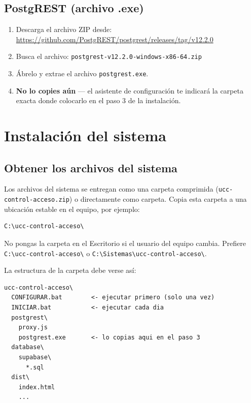 \documentclass[12pt, a4paper]{article}
\begin{document}
\subsection{PostgREST (archivo .exe)}

\begin{enumerate}
  \item Descarga el archivo ZIP desde:\\
        \url{https://github.com/PostgREST/postgrest/releases/tag/v12.2.0}
  \item Busca el archivo: \texttt{postgrest-v12.2.0-windows-x86-64.zip}
  \item Ábrelo y extrae el archivo \texttt{postgrest.exe}.
  \item \textbf{No lo copies aún} — el asistente de configuración te indicará
        la carpeta exacta donde colocarlo en el paso 3 de la instalación.
\end{enumerate}

\section{Instalación del sistema}

\subsection{Obtener los archivos del sistema}

Los archivos del sistema se entregan como una carpeta comprimida
(\texttt{ucc-control-acceso.zip}) o directamente como carpeta.
Copia esta carpeta a una ubicación estable en el equipo, por ejemplo:

\begin{lstlisting}
C:\ucc-control-acceso\
\end{lstlisting}

\begin{importante}
  No pongas la carpeta en el Escritorio si el usuario del equipo cambia.
  Prefiere \texttt{C:\textbackslash{}ucc-control-acceso\textbackslash{}} o
  \texttt{C:\textbackslash{}Sistemas\textbackslash{}ucc-control-acceso\textbackslash{}}.
\end{importante}

La estructura de la carpeta debe verse así:

\begin{lstlisting}
ucc-control-acceso\
  CONFIGURAR.bat        <- ejecutar primero (solo una vez)
  INICIAR.bat           <- ejecutar cada dia
  postgrest\
    proxy.js
    postgrest.exe       <- lo copias aqui en el paso 3
  database\
    supabase\
      *.sql
  dist\
    index.html
    ...
\end{lstlisting}
\end{document}
